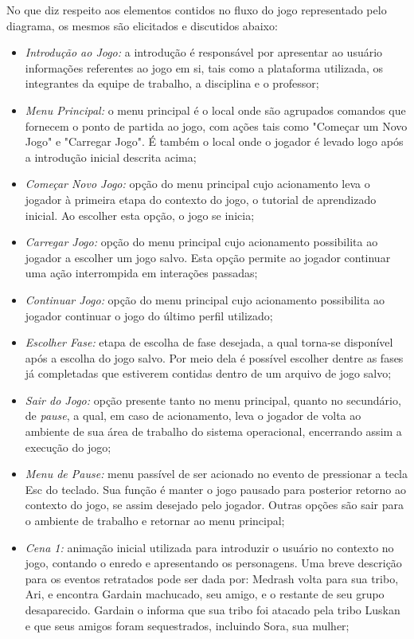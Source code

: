 No que diz respeito aos elementos contidos no fluxo do jogo representado pelo diagrama, os mesmos são elicitados e discutidos abaixo:
\begin{itemize}
\item \textit{Introdução ao Jogo:} a introdução é responsável por apresentar ao usuário informações referentes ao jogo em si, tais como a plataforma utilizada, os integrantes da equipe de trabalho, a disciplina e o professor;
\item \textit{Menu Principal:} o menu principal é o local onde são agrupados comandos que fornecem o ponto de partida ao jogo, com ações tais como "Começar um Novo Jogo" e "Carregar Jogo". É também o local onde o jogador é levado logo após a introdução inicial descrita acima;
\item \textit{Começar Novo Jogo:} opção do menu principal cujo acionamento leva o jogador à primeira etapa do contexto do jogo, o tutorial de aprendizado inicial. Ao escolher esta opção, o jogo se inicia;
\item \textit{Carregar Jogo:} opção do menu principal cujo acionamento possibilita ao jogador a escolher um jogo salvo. Esta opção permite ao jogador continuar uma ação interrompida em interações passadas;
\item \textit{Continuar Jogo:} opção do menu principal cujo acionamento possibilita ao jogador continuar o jogo do último perfil utilizado;
\item \textit{Escolher Fase:} etapa de escolha de fase desejada, a qual torna-se disponível após a escolha do jogo salvo. Por meio dela é possível escolher dentre as fases já completadas que estiverem contidas dentro de um arquivo de jogo salvo;
\item \textit{Sair do Jogo:} opção presente tanto no menu principal, quanto no secundário, de \textit{pause}, a qual, em caso de acionamento, leva o jogador de volta ao ambiente de sua área de trabalho do sistema operacional, encerrando assim a execução do jogo;
\item \textit{Menu de Pause:} menu passível de ser acionado no evento de pressionar a tecla Esc do teclado. Sua função é manter o jogo pausado para posterior retorno ao contexto do jogo, se assim desejado pelo jogador. Outras opções são sair para o ambiente de trabalho e retornar ao menu principal;
\item \textit{Cena 1:} animação inicial utilizada para introduzir o usuário no contexto no jogo, contando o enredo e apresentando os personagens. Uma breve descrição para os eventos retratados pode ser dada por: Medrash volta para sua tribo, Ari, e encontra Gardain machucado, seu amigo, e o restante de seu grupo desaparecido. Gardain o informa que sua tribo foi atacado pela tribo Luskan e que seus amigos foram sequestrados, incluindo Sora, sua mulher;

\end{itemize}
